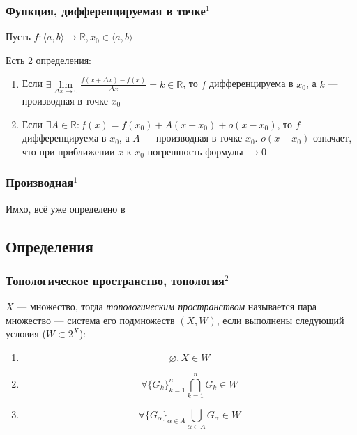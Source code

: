 \documentclass{article}
\begin{document}
\subsubsection{Функция, дифференцируемая в точке\texorpdfstring{$^1$}{}}
\label{ФункДифТоч}
Пусть $f: \langle a, b \rangle \rightarrow \mathbb{R}, x_0 \in \langle a, b \rangle$

Есть 2 определения:
\begin{enumerate}
\item 
Если $\exists \lim\limits_{\Delta x \rightarrow 0} \frac{f(x + \Delta x) - f(x)}{\Delta x} = k \in \mathbb{R}$, то $f$ дифференцируема в $x_0$, а $k$ --- производная в точке $x_0$

\item
Если $\exists A \in \mathbb{R} : f(x) = f(x_0) + A(x - x_0) + o(x - x_0)$, то $f$ дифференцируема в $x_0$, а $A$ --- производная в точке $x_0$. 
$o(x - x_0)$ означает, что при приближении $x$ к $x_0$ погрешность формулы $\rightarrow 0$
\end{enumerate}

\subsubsection{Производная\texorpdfstring{$^1$}{}}
Имхо, всё уже определено в 

\newpage
\subsection{Определения}

\subsubsection{Топологическое пространство, топология\texorpdfstring{$^2$}{}}

$X$ --- множество, тогда \textit{топологическим пространством} называется пара множество --- система его подмножеств $(X, W)$, если выполнены следующий условия ($W \subset 2^X$):

\begin{enumerate}
    \item \[\varnothing, X \in W\]
    \item \[\forall \{G_k\}_{k = 1}^n \bigcap_{k = 1}^n{G_k} \in W\]
    \item \[\forall \{G_\alpha\}_{\alpha \in A} \bigcup_{\alpha \in A}{G_\alpha} \in W\]
\end{enumerate}
\end{document}
